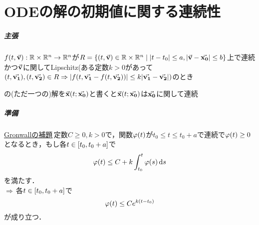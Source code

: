 \documentclass[autodetect-engine,dvipdfmx-if-dvi,ja=standard]{bxjsarticle}
\theoremstyle{mystyle1}
\theoremstyle{mystyle2}
\newcommand{\bbR}{\ensuremath{\mathbb{R}}}
\begin{document}
\section{ODEの解の初期値に関する連続性}
\subparagraph{主張} $f\qty(t,\va{v}):\bbR\times\bbR^n\to\bbR^n$が$R=\qty{\qty(t,\va{v})\in\bbR\times\bbR^n\mid\qty|t-t_0|\leq a,\qty|\va{v}-\va{x_0}|\leq b}$上で連続かつ$\va{v}$に関してLipschitz(ある定数$k>0$があって$\qty(t,\va{v_1}),\qty(t,\va{v_2})\in R\Rightarrow\abs{f\qty(t,\va{v_1}-f\qty(t,\va{v_2}))}\leq k\abs{\va{v_1}-\va{v_2}})$のとき
の(ただ一つの)解を$\va{x}\qty(t;\va{x_0})$と書くと$\va{x}\qty(t;\va{x_0})$は$\va{x_0}$に関して連続
\subparagraph{準備} \underline{Gronwallの補題}\,定数$C\geq 0,k>0$で，関数$\varphi\qty(t)$が$t_0\leq t\leq t_0+a$で連続で$\varphi\qty(t)\geq 0$となるとき，もし各$t\in\qty[t_0,t_0+a]$で
\[\varphi\qty(t)\leq C+k\int_{t_0}^t\varphi\qty(s)\dd{s}\]
を満たす．\\
$\Rightarrow$\,各$t\in\qty[t_0,t_0+a]$で
\[\varphi\qty(t)\leq Ce^{k\qty(t-t_0)}\]
が成り立つ．
\end{document}

